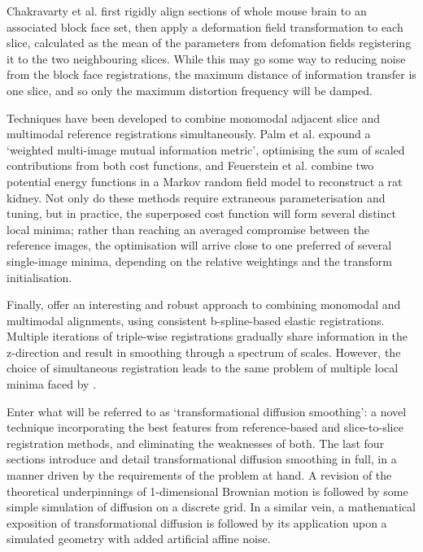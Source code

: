   Chakravarty et al. \cite{Chakravarty2008} first rigidly align sections of whole mouse brain to an associated block face set, then apply a deformation field transformation to each slice, calculated as the mean of the parameters from defomation fields registering it to the two neighbouring slices. While this may go some way to reducing noise from the block face registrations, the maximum distance of information transfer is one slice, and so only the maximum distortion frequency will be damped.
  
  Techniques have been developed to combine monomodal adjacent slice and multimodal reference registrations simultaneously. Palm et al. \cite{Palm2008} expound a `weighted multi-image mutual information metric', optimising the sum of scaled contributions from both cost functions, and Feuerstein et al. \cite{Feuerstein2011} combine two potential energy functions in a Markov random field model to reconstruct a rat kidney. Not only do these methods require extraneous parameterisation and tuning, but in practice, the superposed cost function will form several distinct local minima; rather than reaching an averaged compromise between the reference images, the optimisation will arrive close to one preferred of several single-image minima, depending on the relative weightings and the transform initialisation.
  
  Finally, \cite{Arganda-Carreras2010} offer an interesting and robust approach to combining monomodal and multimodal alignments, using consistent b-spline-based elastic registrations. Multiple iterations of triple-wise registrations gradually share information in the z-direction and result in smoothing through a spectrum of scales. However, the choice of simultaneous registration leads to the same problem of multiple local minima faced by \cite{Palm2008,Feuerstein2011}.
  
  Enter what will be referred to as `transformational diffusion smoothing': a novel technique incorporating the best features from reference-based and slice-to-slice registration methods, and eliminating the weaknesses of both. The last four sections introduce and detail transformational diffusion smoothing in full, in a manner driven by the requirements of the problem at hand. A revision of the theoretical underpinnings of 1-dimensional Brownian motion is followed by some simple simulation of diffusion on a discrete grid. In a similar vein, a mathematical exposition of transformational diffusion is followed by its application upon a simulated geometry with added artificial affine noise.
  
  

